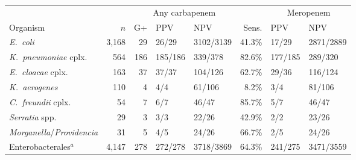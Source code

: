 \begin{tabular}{lrrllrll}
\hline\hline
 & \multicolumn{5}{c}{Any carbapenem} & \multicolumn{2}{c}{Meropenem} \\ \cline{2-6}\cline{7-8} Organism & $n$ & G+ & PPV & NPV & Sens. & PPV & NPV \\
\hline
\textit{E.~coli} & 3{,}168 & 29 & 26/29 & 3102/3139 & 41.3\% & 17/29 & 2871/2889 \\
\textit{K.~pneumoniae} cplx. & 564 & 186 & 185/186 & 339/378 & 82.6\% & 177/185 & 289/320 \\
\textit{E.~cloacae} cplx. & 163 & 37 & 37/37 & 104/126 & 62.7\% & 29/36 & 116/124 \\
\textit{K.~aerogenes} & 110 & 4 & 4/4 & 61/106 & 8.2\% & 3/4 & 81/106 \\
\textit{C.~freundii} cplx. & 54 & 7 & 6/7 & 46/47 & 85.7\% & 5/7 & 46/47 \\
\textit{Serratia} spp. & 29 & 3 & 3/3 & 22/26 & 42.9\% & 2/2 & 23/26 \\
\textit{Morganella}/\textit{Providencia} & 31 & 5 & 4/5 & 24/26 & 66.7\% & 2/5 & 24/26 \\
Enterobacterales$^{a}$ & 4{,}147 & 278 & 272/278 & 3718/3869 & 64.3\% & 241/275 & 3471/3559 \\
\hline\hline
\end{tabular}

